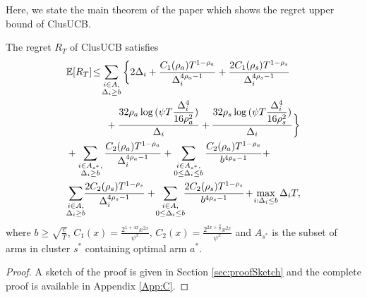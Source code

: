 	
	Here, we state the main theorem of the paper which shows the regret upper bound of ClusUCB.
	
\begin{theorem}
\label{Result:Theorem:1}
The regret $R_T$ of ClusUCB satisfies
\begin{align*}
&\E [R_{T}]\!\leq\! 
\sum\limits_{\substack{i\in A,\\\Delta_{i}\geq b}} \bigg\lbrace 2\Delta_{i}+
\dfrac{C_1(\rho_{a})T^{1-\rho_{a}}}{\Delta_{i}^{4\rho_{a}-1}} 
+ \dfrac{2C_1(\rho_{s})T^{1-\rho_{s}}}{\Delta_{i}^{4\rho_{s}-1}} \\
&\qquad\qquad+ \frac{32\rho_{a}\log{(\psi T\dfrac{\Delta_{i}^{4}}{16\rho_{a}^{2}})}}{\Delta_{i}}
+ \dfrac{32\rho_{s}\log{(\psi T\dfrac{\Delta_{i}^{4}}{16\rho_{s}^{2}})}}{\Delta_{i}}\bigg\rbrace  \\
&+ \sum\limits_{\substack{i\in A_{s^{*}},\\ \Delta_{i}\geq b}} 
\frac{C_2(\rho_{a})T^{1-\rho_{a}}}{\Delta_{i}^{4\rho_{a}-1}}+\sum\limits_{\substack{i\in A_{s^{*}},\\0\leq\Delta_{i}\leq b}}\frac{C_2(\rho_a)T^{1-\rho_{a}}}{b^{4\rho_{a} -1}} + \\
&\!\sum\limits_{\substack{i\in A,\\ \Delta_{i}\geq b}}\! \! \dfrac{2C_2(\rho_{s})T^{1-\rho_{s}}}{\Delta_{i}^{4\rho_{s}-1}} + \!\sum\limits_{\substack{i\in A,\\0\leq\Delta_{i}\leq b}}\! \! \dfrac{2C_2(\rho_{s})T^{1-\rho_{s}}}{b^{4\rho_{s} -1}}  
\!+\! \max\limits_{i:\Delta_{i}\leq b}\Delta_{i}T, 
\end{align*}
where $b\geq \sqrt{\frac{e}{T}}$, $C_1(x) = \frac{2^{1+4x}x^{2x}}{\psi^{x}}$, $C_2(x) = \frac{2^{2x+\frac{3}{2}}x^{2x}}{\psi^{x}}$ and $A_{s^{*}}$ is the subset of arms in cluster $s^{*}$ containing optimal arm $a^{*}$.
\end{theorem}
\begin{proof}
 A sketch of the proof is given in Section \ref{sec:proofSketch} and the complete proof is available in Appendix \ref{App:C}.
\end{proof}

	
	

